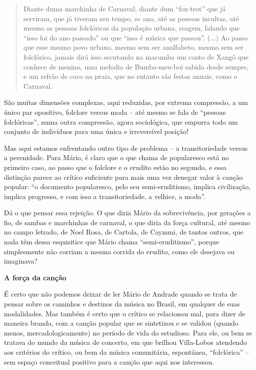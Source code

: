 \begin{quote}
Diante duma marchinha de Carnaval, diante dum ``fox-trot'' que já
serviram, que já tiveram seu tempo, se ano, até as pessoas incultas, até
mesmo as pessoas folclóricas da população urbana, reagem, falando que
``isso foi do ano passado'' ou que ``isso é música que passou''. (...)
Ao passo que esse mesmo povo urbano, mesmo sem ser analfabeto, mesmo sem
ser folclórico, jamais dirá isso escutando na macumba um canto de Xangô
que conhece de menino, uma melodia de Bumba-meu-boi sabida desde sempre,
e um refrão de coco na praia, que no entanto são festas anuais, como o
Carnaval.
\end{quote}

São muitas dimensões complexas, aqui reduzidas, por extrema compressão,
a um único par opositivo, folclore versus moda -- até mesmo se fala de
``pessoas folclóricas'', numa outra compressão, agora sociológica, que
empurra todo um conjunto de indivíduos para uma única e irreversível
posição!

Mas aqui estamos enfrentando outro tipo de problema -- a transitoriedade
versus a perenidade. Para Mário, é claro que o que chama de popularesco
está no primeiro caso, ao passo que o folclore e o erudito estão no
segundo, e essa distinção parece ao crítico suficiente para mais uma vez
denegar valor à canção popular: ``o documento popularesco, pelo seu
semi-eruditismo, implica civilização, implica progresso, e com isso a
transitoriedade, a velhice, a moda''.

Dá o que pensar essa rejeição. O que diria Mário da sobrevivência, por
gerações a fio, de sambas e marchinhas de carnaval, o que diria da força
cultural, até mesmo no campo letrado, de Noel Rosa, de Cartola, de
Caymmi, de tantos outros, que nada têm dessa esquisitice que Mário chama
``semi-eruditismo'', porque simplesmente não corriam a mesma corrida do
erudito, como ele desejava ou imaginava?

\textbf{A força da canção}

É certo que não podemos deixar de ler Mário de Andrade quando se trata
de pensar sobre os caminhos e destinos da música no Brasil, em qualquer
de suas modalidades. Mas também é certo que o crítico se relacionou mal,
para dizer de maneira branda, com a canção popular que se sintetizou e
se validou (quando menos, mercadologicamente) no período de vida do
estudioso. Para ele, ou bem se tratava do mundo da música de concerto,
em que brilhou Villa-Lobos atendendo aos critérios do crítico, ou bem da
música comunitária, espontânea, ``folclórica'' -- sem espaço conceitual
positivo para a canção que aqui nos interessou.

